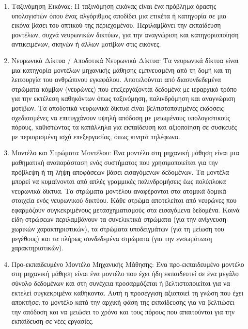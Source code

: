 \begin{enumerate}
    \item Ταξινόμηση Εικόνας: Η ταξινόμηση εικόνας είναι ένα πρόβλημα όρασης υπολογιστών όπου ένας αλγόριθμος αποδίδει μια ετικέτα ή κατηγορία σε μια εικόνα βάσει του οπτικού της περιεχομένου. Περιλαμβάνει την εκπαίδευση μοντέλων, συχνά νευρωνικών δικτύων, για την αναγνώριση και κατηγοριοποίηση αντικειμένων, σκηνών ή άλλων μοτίβων στις εικόνες. 

    \item Νευρωνικά Δίκτυα / Αποδοτικά Νευρωνικά Δίκτυα: Τα νευρωνικά δίκτυα είναι μια κατηγορία μοντέλων μηχανικής μάθησης εμπνευσμένη από τη δομή και τη λειτουργία του ανθρώπινου εγκεφάλου. Αποτελούνται από διασυνδεδεμένα στρώματα κόμβων (νευρώνες) που επεξεργάζονται δεδομένα με ιεραρχικό τρόπο για την εκτέλεση καθηκόντων όπως ταξινόμηση, παλινδρόμηση και αναγνώριση μοτίβων. Τα αποδοτικά νευρωνικά δίκτυα είναι βελτιστοποιημένες εκδόσεις σχεδιασμένες να επιτυγχάνουν υψηλή απόδοση με μειωμένους υπολογιστικούς πόρους, καθιστώντας τα κατάλληλα για εκπαίδευση και αξιοποίηση σε συσκευές με περιορισμένη ισχύ επεξεργασίας, όπως κινητά τηλέφωνα. 

    \item Μοντέλο και Στρώματα Μοντέλου: Ένα μοντέλο στη μηχανική μάθηση είναι μια μαθηματική αναπαράσταση ενός συστήματος που χρησιμοποιείται για την πρόβλεψη ή τη λήψη αποφάσεων βάσει εισαγόμενων δεδομένων. Τα μοντέλα μπορεί να κυμαίνονται από απλές γραμμικές παλινδρομήσεις έως πολύπλοκα νευρωνικά δίκτυα. Τα στρώματα μοντέλου αναφέρονται στα ατομικά δομικά στοιχεία ενός νευρωνικού δικτύου. Κάθε στρώμα αποτελείται από νευρώνες που εφαρμόζουν συγκεκριμένους μετασχηματισμούς στα εισαγόμενα δεδομένα. Κοινά είδη στρώσεων περιλαμβάνουν τα συνελικτικά στρώματα (για την ανίχνευση χωρικών χαρακτηριστικών), τα στρώματα υποδειγμάτων (για τη μείωση του μεγέθους) και τα πλήρως συνδεδεμένα στρώματα (για την ενσωμάτωση χαρακτηριστικών). 

    \item Προ-εκπαιδευμένο Μοντέλο Μηχανικής Μάθησης: Ένα προ-εκπαιδευμένο μοντέλο στη μηχανική μάθηση είναι ένα μοντέλο που έχει ήδη εκπαιδευτεί σε ένα μεγάλο σύνολο δεδομένων και στη συνέχεια προσαρμόζεται ή βελτιστοποιείται για να εκτελεί συγκεκριμένα καθήκοντα. Αυτή η προσέγγιση αξιοποιεί τη γνώση που έχει αποκτήσει το μοντέλο κατά την αρχική φάση της εκπαίδευσης για να βελτιώσει την απόδοση και να μειώσει το χρόνο και τους πόρους που απαιτούνται για την εκπαίδευση σε νέες εργασίες. 


\end{enumerate}
